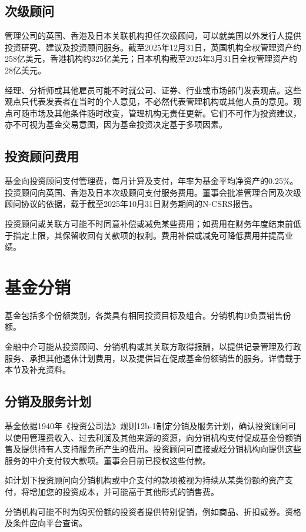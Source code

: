 \documentclass[UTF8,fontset=none,11pt,a4paper]{ctexart}
\begin{document}
\subsection*{次级顾问}
管理公司的英国、香港及日本关联机构担任次级顾问，可以就美国以外发行人提供投资研究、建议及投资顾问服务。截至2025年12月31日，英国机构全权管理资产约258亿美元，香港机构约325亿美元；日本机构截至2025年3月31日全权管理资产约28亿美元。


经理、分析师或其他雇员可能不时就公司、证券、行业或市场部门发表观点。这些观点只代表发表者在当时的个人意见，不必然代表管理机构或其他人员的意见。观点可随市场及其他条件随时改变，管理机构无责任更新。它们不可作为投资建议，亦不可视为基金交易意图，因为基金投资决定基于多项因素。


\subsection*{投资顾问费用}
基金向投资顾问支付管理费，每月计算及支付，年率为基金平均净资产的0.25\%。投资顾问向英国、香港及日本次级顾问支付服务费用。董事会批准管理合同及次级顾问协议的依据，载于截至2025年10月31日财务期间的N-CSRS报告。


投资顾问或关联方可能不时同意补偿或减免某些费用；如费用在财务年度结束前低于指定上限，其保留收回有关款项的权利。费用补偿或减免可降低费用并提高业绩。


\section*{基金分销}
基金包括多个份额类别，各类具有相同投资目标及组合。分销机构D负责销售份额。


金融中介可能从投资顾问、分销机构或其关联方取得报酬，以提供记录管理及行政服务、承担其他退休计划费用，以及提供旨在促成基金份额销售的服务。详情载于本节及补充资料。


\subsection*{分销及服务计划}
基金依据1940年《投资公司法》规则12b-1制定分销及服务计划，确认投资顾问可以使用管理费收入、过去利润及其他来源的资源，向分销机构支付促成基金份额销售及提供持有人支持服务所产生的费用。投资顾问可直接或经分销机构向提供这些服务的中介支付较大款项。董事会目前已授权这些付款。


如计划下投资顾问向分销机构或中介支付的款项被视为持续从某类份额的资产支付，将增加您的投资成本，并可能高于其他形式的销售费。


分销机构可能不时为购买份额的投资者提供特别促销，例如商品、折扣或券。资格及条件应向平台查询。
\end{document}
